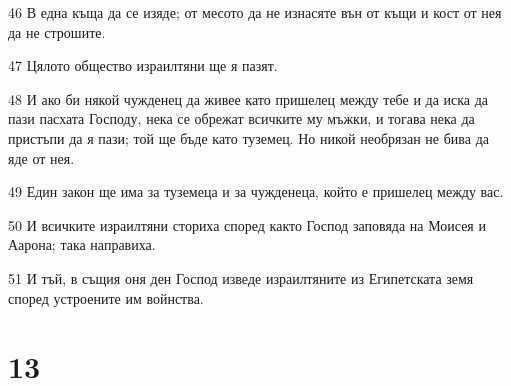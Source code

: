 \par 46 В една къща да се изяде; от месото да не изнасяте вън от къщи и кост от нея да не строшите.
\par 47 Цялото общество израилтяни ще я пазят.
\par 48 И ако би някой чужденец да живее като пришелец между тебе и да иска да пази пасхата Господу, нека се обрежат всичките му мъжки, и тогава нека да пристъпи да я пази; той ще бъде като туземец. Но никой необрязан не бива да яде от нея.
\par 49 Един закон ще има за туземеца и за чужденеца, който е пришелец между вас.
\par 50 И всичките израилтяни сториха според както Господ заповяда на Моисея и Аарона; така направиха.
\par 51 И тъй, в същия оня ден Господ изведе израилтяните из Египетската земя според устроените им войнства.

\chapter{13}

